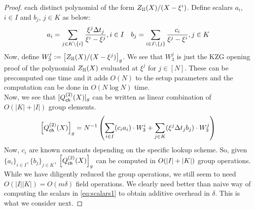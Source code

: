 \begin{proof}
    each distinct polynomial of the form $Z_\mathbb{H}(X)/(X-\xi^i)$. Define scalars $a_i$, $i\in I$ and $b_j$, $j\in K$ as below:
    \begin{gather}\label{eq:scalars1}
    a_i = \sum_{j\in K\setminus \{i\}}\frac{\xi^j\Delta t_j}{\xi^i-\xi^j}, i\in \setind\quad
    b_j=  \sum_{i\in \setind\setminus \{j\}}\frac{c_i}{\xi^j - \xi^i}, j\in K
    \end{gather}
    Now, define
    $W_3^j:=\left[{Z_\mathbb{H}(X)/(X-\xi^j)}\right]_g$. We see that $W_3^j$ is just the KZG opening proof of the polynomial $Z_\mathbb{H}(X)$ evaluated at $\xi^j$ for $j \in [N]$. These can be precomputed one time and it adds $O(N)$ to the setup parameters and the computation can be done in $O(N\log N)$ time.\\ Now, we see that   $[Q^{(2)}_{\mathsf{ch}}({X})]_g$ can be written as linear combination of $O(|K|+|I|)$ group elements.
    \begin{equation}\label{eq:Qcachepoly2commit}
    \gany{\Qcachepolytwo{X}} = N^{-1}\left(\sum_{i\in\setind}(c_ia_i)\cdot W_3^i + \sum_{j\in K}(\xi^j \Delta t_j b_j)\cdot W_3^j\right)
    \end{equation}
    Now, $c_i$ are known constants depending on the specific lookup scheme. So, given $\{a_i\}_{i\in I}, \{b_j\}_{j\in K}$, $\left[{Q^{(2)}_{\mathsf{ch}}({X})}\right]_g$ can be computed in $O(|I|+|K|)$ group operations.
    While we have diligently reduced the group operations, we still seem to need $O(|I||K|)=O(m\delta)$ field operations. We clearly need better than
    naive way of computing the scalars in \eqref{eq:scalars1} to obtain additive overhead in $\delta$. This is what we consider next.

\end{proof}

